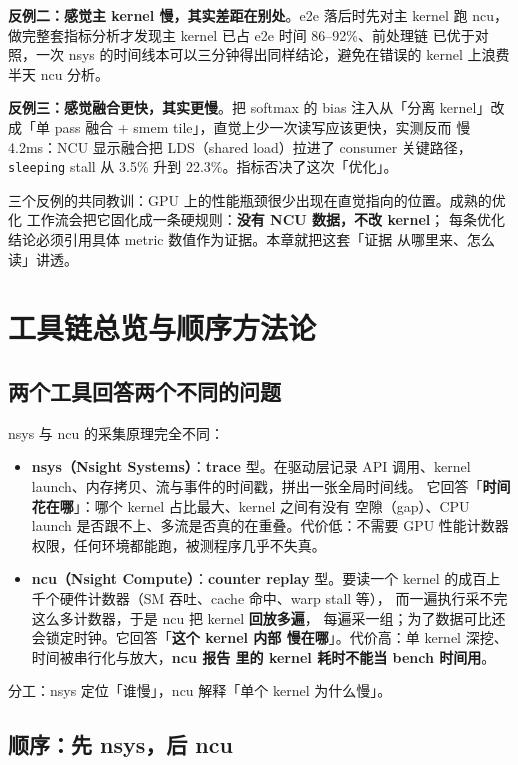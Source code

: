 \textbf{反例二：感觉主 kernel 慢，其实差距在别处}。e2e 落后时先对主 kernel
跑 ncu，做完整套指标分析才发现主 kernel 已占 e2e 时间 86--92\%、前处理链
已优于对照，一次 nsys 的时间线本可以三分钟得出同样结论，避免在错误的
kernel 上浪费半天 ncu 分析。

\textbf{反例三：感觉融合更快，其实更慢}。把 softmax 的 bias 注入从「分离
kernel」改成「单 pass 融合 + smem tile」，直觉上少一次读写应该更快，实测反而
慢 4.2ms：NCU 显示融合把 LDS（shared load）拉进了 consumer 关键路径，
\texttt{sleeping} stall 从 3.5\% 升到 22.3\%。指标否决了这次「优化」。

三个反例的共同教训：GPU 上的性能瓶颈很少出现在直觉指向的位置。成熟的优化
工作流会把它固化成一条硬规则：\textbf{没有 NCU 数据，不改 kernel}；
每条优化结论必须引用具体 metric 数值作为证据。本章就把这套「证据
从哪里来、怎么读」讲透。

\section{工具链总览与顺序方法论}\label{sec:ch00-tools}

\subsection{两个工具回答两个不同的问题}

nsys 与 ncu 的采集原理完全不同：

\begin{itemize}
\item \textbf{nsys（Nsight Systems）}：\textbf{trace} 型。在驱动层记录 API
  调用、kernel launch、内存拷贝、流与事件的时间戳，拼出一张全局时间线。
  它回答「\textbf{时间花在哪}」：哪个 kernel 占比最大、kernel 之间有没有
  空隙（gap）、CPU launch 是否跟不上、多流是否真的在重叠。代价低：不需要
  GPU 性能计数器权限，任何环境都能跑，被测程序几乎不失真。
\item \textbf{ncu（Nsight Compute）}：\textbf{counter replay} 型。要读一个
  kernel 的成百上千个硬件计数器（SM 吞吐、cache 命中、warp stall 等），
  而一遍执行采不完这么多计数器，于是 ncu 把 kernel \textbf{回放多遍}，
  每遍采一组；为了数据可比还会锁定时钟。它回答「\textbf{这个 kernel 内部
  慢在哪}」。代价高：单 kernel 深挖、时间被串行化与放大，\textbf{ncu 报告
  里的 kernel 耗时不能当 bench 时间用}。
\end{itemize}

分工：nsys 定位「谁慢」，ncu 解释「单个 kernel 为什么慢」。

\subsection{顺序：先 nsys，后 ncu}

